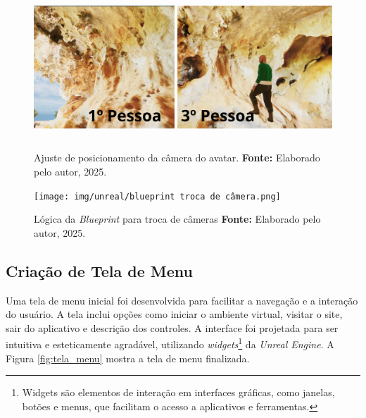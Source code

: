 \begin{figure}[H]
        \centering
        \includegraphics[height=6cm, keepaspectratio]{img/unreal/1 pessoa e 3 pessoa comparacao.png}
        \caption{Ajuste de posicionamento da câmera do avatar.
            \textbf{Fonte:} Elaborado pelo autor, 2025.}
        \label{fig:alternarcamera}
\end{figure}

\begin{figure}[H]
        \centering
        \texttt{[image: img/unreal/blueprint troca de câmera.png]}
        \caption{Lógica da \textit{Blueprint} para troca de câmeras
            \textbf{Fonte:} Elaborado pelo autor, 2025.}
        \label{fig:blueprint_camera}
\end{figure}

\subsection{Criação de Tela de Menu}
Uma tela de menu inicial foi desenvolvida para facilitar a navegação e a interação do usuário. A tela inclui opções como iniciar o ambiente virtual, visitar o site, sair do aplicativo e descrição dos controles.
A interface foi projetada para ser intuitiva e esteticamente agradável, utilizando \textit{widgets}\footnote{Widgets são elementos de interação em interfaces gráficas, como janelas, botões e menus, que facilitam o acesso a aplicativos e ferramentas.} da \textit{Unreal Engine}. A Figura \ref{fig:tela_menu} mostra a tela de menu finalizada.

